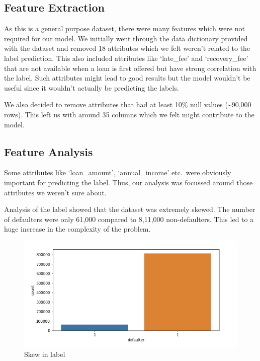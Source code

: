 \documentclass[conference]{IEEEtran}
\begin{document}
\subsection{Feature Extraction}
As this is a general purpose dataset, there were many features which were not
required for our model. We initially went through the data dictionary provided
with the dataset and removed 18 attributes which we felt weren't related to the
label prediction. This also included attributes like `late\_fee' and
`recovery\_fee' that are not available when a loan is first offered but have
strong correlation with the label. Such attributes might lead to good results
but the model wouldn't be useful since it wouldn't actually be predicting the
labels.

We also decided to remove attributes that had at least 10\% null values
(\textasciitilde 90,000 rows). This left us with around 35 columns which we felt
might contribute to the model.

\subsection{Feature Analysis}
Some attributes like `loan\_amount', `annual\_income' etc.\ were obviously
important for predicting the label. Thus, our analysis was focussed around those
attributes we weren't sure about.

Analysis of the label showed that the dataset was extremely skewed. The number
of defaulters were only 61,000 compared to 8,11,000 non-defaulters. This led to
a huge increase in the complexity of the problem.

\begin{figure}[ht]
    \includegraphics[width=\columnwidth]{defaulter_skew}
    \caption{Skew in label}
\end{figure}
\end{document}

